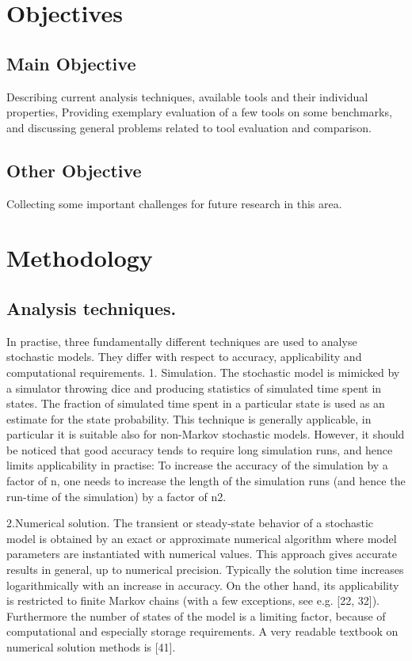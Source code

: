 \documentclass[14pt]{article}
\begin{document}
\section{Objectives}
\subsection{Main Objective}
Describing current analysis techniques, available tools and their individual properties,
Providing exemplary evaluation of a few tools on some benchmarks, and discussing general problems related to tool evaluation and comparison.
\subsection{Other Objective}
Collecting some important challenges for future research in this area.

\section{Methodology}
\subsection{Analysis techniques.}
In practise, three fundamentally different techniques are used to
analyse stochastic models. They differ with respect to accuracy, applicability and computational requirements.
1.  Simulation.  The stochastic model is mimicked by a simulator throwing dice and producing
statistics of simulated time spent in states. The fraction of simulated time spent in
a particular state is used as an estimate for the state probability. This technique
is generally applicable, in particular it is suitable also for non-Markov stochastic
models. However, it should be noticed that good accuracy tends to require long
simulation runs, and hence limits applicability in practise: To increase the accuracy
of the simulation by a factor of n, one needs to increase the length of the simulation
runs (and hence the run-time of the simulation) by a factor of  n2.

2.Numerical solution.  
The transient or steady-state behavior of a stochastic model is obtained by an exact or approximate numerical algorithm where model parameters are
instantiated with numerical values. This approach gives accurate results in general,
up to numerical precision. Typically the solution time increases logarithmically with
an increase in accuracy. On the other hand, its applicability is restricted to finite
Markov chains (with a few exceptions, see e.g. [22, 32]). Furthermore the number of
states of the model is a limiting factor, because of computational and especially storage requirements. A very readable textbook on numerical solution methods is [41].
\end{document}

